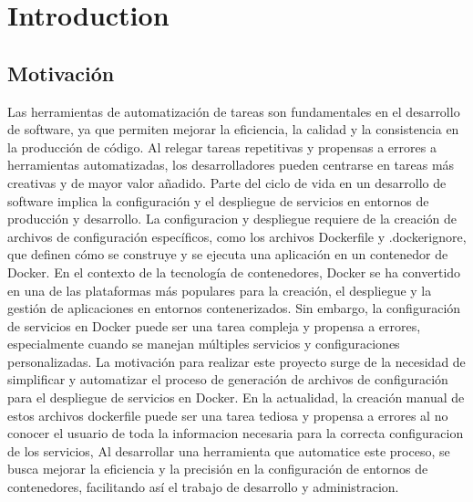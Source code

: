 \documentclass[12pt, a4paper, twoside]{article}
\begin{document}

\newpage




\newpage


\newpage

\tableofcontents
\newpage








\section{Introduction}

\subsection{Motivación}
Las herramientas de automatización de tareas son fundamentales en el desarrollo de software, ya que permiten mejorar la eficiencia, la calidad y la consistencia en la producción de código.
Al relegar tareas repetitivas y propensas a errores a herramientas automatizadas, los desarrolladores pueden centrarse en tareas más creativas y de mayor valor añadido.
Parte del ciclo de vida en un desarrollo de software implica la configuración y el despliegue de servicios en entornos de producción y desarrollo.
La configuracion y despliegue requiere de la creación de archivos de configuración específicos, como los archivos Dockerfile y .dockerignore, que definen cómo se construye y se ejecuta una aplicación en un contenedor de Docker.
En el contexto de la tecnología de contenedores, Docker se ha convertido en una de las plataformas más populares para la creación, el despliegue y la gestión de aplicaciones en entornos contenerizados. 
Sin embargo, la configuración de servicios en Docker puede ser una tarea compleja y propensa a errores, especialmente cuando se manejan múltiples servicios y configuraciones personalizadas.
La motivación para realizar este proyecto surge de la necesidad de simplificar y automatizar el proceso de generación de archivos de configuración para el despliegue de servicios en Docker. 
En la actualidad, la creación manual de estos archivos dockerfile puede ser una tarea tediosa y propensa a errores al no conocer el usuario de toda la informacion necesaria para la correcta configuracion de los servicios, 
Al desarrollar una herramienta que automatice este proceso, 
se busca mejorar la eficiencia y la precisión en la configuración de entornos de contenedores, facilitando así el trabajo de desarrollo y administracion. 
\end{document}
